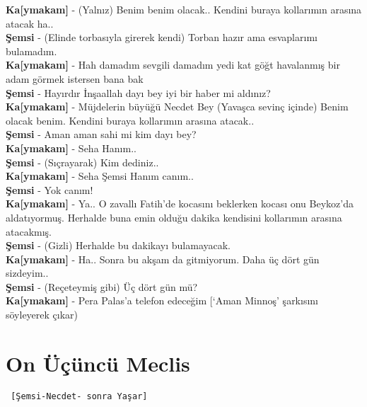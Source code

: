 \documentclass[]{book}
\begin{document}
\textbf{Ka{[}ymakam{]}} - (Yalnız) Benim benim olacak.. Kendini buraya kollarımın arasına atacak ha..\\
\textbf{Şemsi} - (Elinde torbasıyla girerek kendi) Torban hazır ama esvaplarımı bulamadım.\\
\textbf{Ka{[}ymakam{]}} - Hah damadım sevgili damadım yedi kat göğt havalanmış bir adam görmek istersen bana bak\\
\textbf{Şemsi} - Hayırdır İnşaallah dayı bey iyi bir haber mi aldınız?\\
\textbf{Ka{[}ymakam{]}} - Müjdelerin büyüğü Necdet Bey (Yavaşca sevinç içinde) Benim olacak benim. Kendini buraya kollarımın arasına atacak..\\
\textbf{Şemsi} - Aman aman sahi mi kim dayı bey?\\
\textbf{Ka{[}ymakam{]}} - Seha Hanım..\\
\textbf{Şemsi} - (Sıçrayarak) Kim dediniz..\\
\textbf{Ka{[}ymakam{]}} - Seha Şemsi Hanım canım..\\
\textbf{Şemsi} - Yok canım!\\
\textbf{Ka{[}ymakam{]}} - Ya.. O zavallı Fatih'de kocasını beklerken kocası onu Beykoz'da aldatıyormuş. Herhalde buna emin olduğu dakika kendisini kollarımın arasına atacakmış.\\
\textbf{Şemsi} - (Gizli) Herhalde bu dakikayı bulamayacak.\\
\textbf{Ka{[}ymakam{]}} - Ha.. Sonra bu akşam da gitmiyorum. Daha üç dört gün sizdeyim..\\
\textbf{Şemsi} - (Reçeteymiş gibi) Üç dört gün mü?\\
\textbf{Ka{[}ymakam{]}} - Pera Palas'a telefon edeceğim {[}`Aman Minnoş' şarkısını söyleyerek çıkar)\\

\hypertarget{on-ucuncu-meclis-1}{%
\section{On Üçüncü Meclis}\label{on-ucuncu-meclis-1}}

\begin{verbatim}
 [Şemsi-Necdet- sonra Yaşar]
\end{verbatim}
\end{document}

